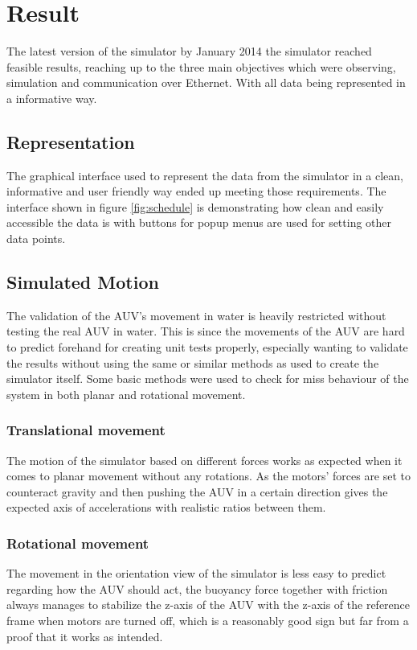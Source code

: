 \section{Result}\label{sec:result}

The latest version of the simulator by January 2014 the simulator reached feasible results, reaching up to the three main objectives which were observing, simulation and communication over Ethernet. With all data being represented in a informative way. 

\subsection{Representation}
The graphical interface used to represent the data from the simulator in a clean, informative and user friendly way ended up meeting those requirements. The interface shown in figure \ref{fig:schedule} is demonstrating how clean and easily accessible the data is with buttons for popup menus are used for setting other data points.

\subsection{Simulated Motion}
The validation of the AUV's movement in water is heavily restricted without testing the real AUV in water. This is since the movements of the AUV are hard to predict forehand for creating unit tests properly, especially wanting to validate the results without using the same or similar methods as used to create the simulator itself. Some basic methods were used to check for miss behaviour of the system in both planar and rotational movement.
\subsubsection{Translational movement}
The motion of the simulator based on different forces works as expected when it comes to planar movement without any rotations. As the motors' forces are set to counteract gravity and then pushing the AUV in a certain direction gives the expected axis of accelerations with realistic ratios between them.
\subsubsection{Rotational movement}
The movement in the orientation view of the simulator is less easy to predict regarding how the AUV should act, the buoyancy force together with friction always manages to stabilize the z-axis of the AUV with the z-axis of the reference frame when motors are turned off, which is a reasonably good sign but far from a proof that it works as intended.

